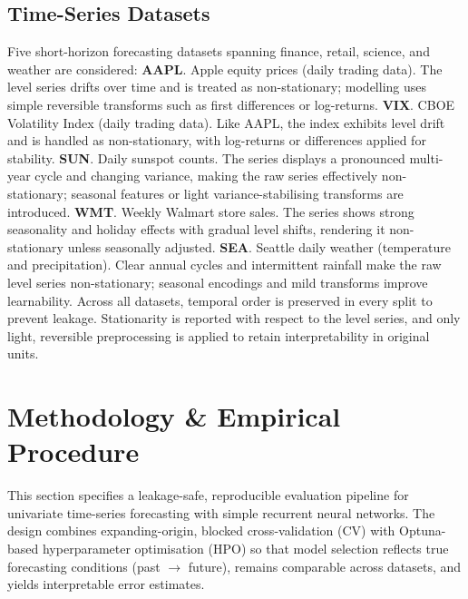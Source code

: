 \documentclass[conference]{IEEEtran}
\begin{document}
\subsection{\textbf{Time-Series Datasets}}
Five short-horizon forecasting datasets spanning finance, retail, science, and weather are considered:
\noindent\textbf{AAPL}. Apple equity prices (daily trading data). The level series drifts over time and is treated as non-stationary; modelling uses simple reversible transforms such as first differences or log-returns.
\noindent\textbf{VIX}. CBOE Volatility Index (daily trading data). Like AAPL, the index exhibits level drift and is handled as non-stationary, with log-returns or differences applied for stability.
\noindent\textbf{SUN}. Daily sunspot counts. The series displays a pronounced multi-year cycle and changing variance, making the raw series effectively non-stationary; seasonal features or light variance-stabilising transforms are introduced. 
\noindent\textbf{WMT}. Weekly Walmart store sales. The series shows strong seasonality and holiday effects with gradual level shifts, rendering it non-stationary unless seasonally adjusted.  
\noindent\textbf{SEA}. Seattle daily weather (temperature and precipitation). Clear annual cycles and intermittent rainfall make the raw level series non-stationary; seasonal encodings and mild transforms improve learnability.  
Across all datasets, temporal order is preserved in every split to prevent leakage. Stationarity is reported with respect to the level series, and only light, reversible preprocessing is applied to retain interpretability in original units.

\section{\textbf{Methodology \& Empirical Procedure}}

This section specifies a leakage-safe, reproducible evaluation pipeline for univariate time-series forecasting with simple recurrent neural networks. The design combines expanding-origin, blocked cross-validation (CV) with Optuna-based hyperparameter optimisation (HPO) so that model selection reflects true forecasting conditions (past $\rightarrow$ future), remains comparable across datasets, and yields interpretable error estimates.
\end{document}
